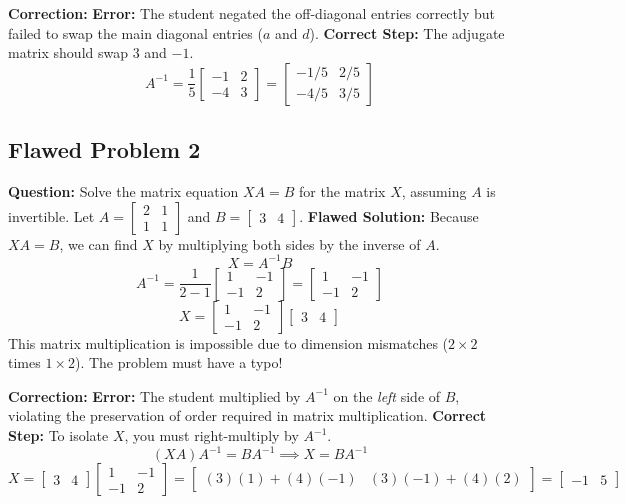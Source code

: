 \documentclass[12pt]{article}
\begin{document}
\textbf{Correction:}
\textbf{Error:} The student negated the off-diagonal entries correctly but failed to swap the main diagonal entries ($a$ and $d$).
\textbf{Correct Step:} The adjugate matrix should swap $3$ and $-1$.
\[ A^{-1} = \frac{1}{5} \begin{bmatrix} -1 & 2 \\ -4 & 3 \end{bmatrix} = \begin{bmatrix} -1/5 & 2/5 \\ -4/5 & 3/5 \end{bmatrix} \]

\subsection{Flawed Problem 2}
\textbf{Question:} Solve the matrix equation $X A = B$ for the matrix $X$, assuming $A$ is invertible. Let $A = \begin{bmatrix} 2 & 1 \\ 1 & 1 \end{bmatrix}$ and $B = \begin{bmatrix} 3 & 4 \end{bmatrix}$.
\textbf{Flawed Solution:}
Because $X A = B$, we can find $X$ by multiplying both sides by the inverse of $A$.
\[ X = A^{-1} B \]
\[ A^{-1} = \frac{1}{2-1} \begin{bmatrix} 1 & -1 \\ -1 & 2 \end{bmatrix} = \begin{bmatrix} 1 & -1 \\ -1 & 2 \end{bmatrix} \]
\[ X = \begin{bmatrix} 1 & -1 \\ -1 & 2 \end{bmatrix} \begin{bmatrix} 3 & 4 \end{bmatrix} \]
This matrix multiplication is impossible due to dimension mismatches ($2 \times 2$ times $1 \times 2$). The problem must have a typo!

\textbf{Correction:}
\textbf{Error:} The student multiplied by $A^{-1}$ on the \textit{left} side of $B$, violating the preservation of order required in matrix multiplication. 
\textbf{Correct Step:} To isolate $X$, you must right-multiply by $A^{-1}$.
\[ (XA)A^{-1} = BA^{-1} \implies X = B A^{-1} \]
\[ X = \begin{bmatrix} 3 & 4 \end{bmatrix} \begin{bmatrix} 1 & -1 \\ -1 & 2 \end{bmatrix} = \begin{bmatrix} (3)(1)+(4)(-1) & (3)(-1)+(4)(2) \end{bmatrix} = \begin{bmatrix} -1 & 5 \end{bmatrix} \]
\end{document}
